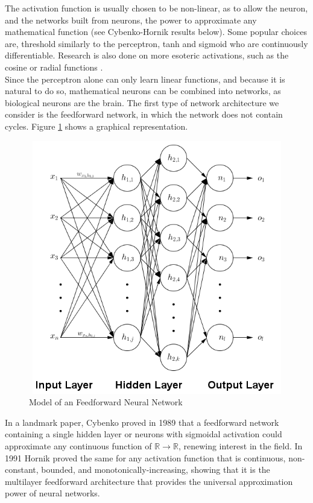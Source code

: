 \documentclass[12pt,oneside]{CUNY_CS_PhD}
\begin{document}
The activation function is usually chosen to be non-linear, as to allow the neuron, and the networks built from neurons, the power to approximate any mathematical function (see Cybenko-Hornik results below).
Some popular choices are, threshold similarly to the perceptron, tanh and sigmoid who are continuously differentiable. Research is also done on more esoteric activations, such as the cosine or radial functions \cite{lee_cosine-modulated_1996}.\\
Since the perceptron alone can only learn linear functions, and because it is natural to do so, mathematical neurons can be combined into networks, as biological neurons are the brain. The first type of network architecture we consider is the feedforward network, in which the  network does not contain cycles. Figure \ref{fig:feedforward} shows a graphical representation.\\
\begin{figure}[!htbp]
\centering
\includegraphics[keepaspectratio=false, height=11.09cm, width=12.5cm]{pictures/FeedForwardNeuralNetwork.png}
\caption{Model of an Feedforward Neural Network}
\label{fig:feedforward}
\end{figure}
\newpage
In a landmark paper, Cybenko \cite{cybenko1989approximation} proved in 1989 that a feedforward network containing a single hidden layer or neurons with sigmoidal activation could approximate any continuous function of $\mathbb{R} \rightarrow \mathbb{R}$, renewing interest in the field. In 1991 Hornik \cite{Hornik:1991} proved the same for any activation function that is continuous, non-constant, bounded, and monotonically-increasing, showing that it is the multilayer feedforward architecture that provides the universal approximation power of neural networks.\\
\end{document}
